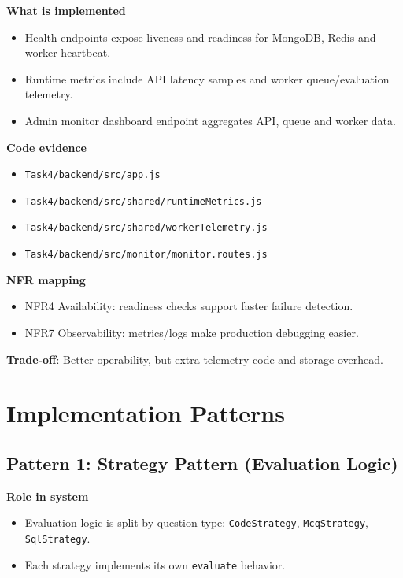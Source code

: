 \documentclass[12pt,journal,onecolumn]{IEEEtran}
\begin{document}
\textbf{What is implemented}
\begin{itemize}
    \item Health endpoints expose liveness and readiness for MongoDB, Redis and worker heartbeat.
    \item Runtime metrics include API latency samples and worker queue/evaluation telemetry.
    \item Admin monitor dashboard endpoint aggregates API, queue and worker data.
\end{itemize}

\textbf{Code evidence}
\begin{itemize}
    \item \texttt{Task4/backend/src/app.js}
    \item \texttt{Task4/backend/src/shared/runtimeMetrics.js}
    \item \texttt{Task4/backend/src/shared/workerTelemetry.js}
    \item \texttt{Task4/backend/src/monitor/monitor.routes.js}
\end{itemize}

\textbf{NFR mapping}
\begin{itemize}
    \item NFR4 Availability: readiness checks support faster failure detection.
    \item NFR7 Observability: metrics/logs make production debugging easier.
\end{itemize}

\textbf{Trade-off}: Better operability, but extra telemetry code and storage overhead.

\section{Implementation Patterns}

\subsection{Pattern 1: Strategy Pattern (Evaluation Logic)}

\textbf{Role in system}
\begin{itemize}
    \item Evaluation logic is split by question type: \texttt{CodeStrategy}, \texttt{McqStrategy}, \texttt{SqlStrategy}.
    \item Each strategy implements its own \texttt{evaluate} behavior.
\end{itemize}
\end{document}
